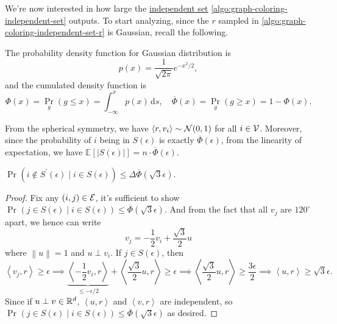 We're now interested in how large the \hyperref[def:independent-set]{independent set} \autoref{algo:graph-coloring-independent-set} outputs. To start analyzing, since the \(r\) sampled in \autoref{algo:graph-coloring-independent-set-r} is Gaussian, recall the following.

\begin{prev}
	The probability density function for Gaussian distribution is
	\[
		p(x) = \frac{1}{\sqrt{2\pi } }e^{- x^{2} / 2},
	\]
	and the cumulated density function is
	\[
		\Phi (x) = \Pr_{g}(g \leq x) = \int_{-\infty}^{x} p(x) \,\mathrm{d}s, \quad \overline{\Phi }(x) = \Pr_{g}(g \geq x) = 1 - \Phi (x).
	\]
\end{prev}

From the spherical symmetry, we have \(\left\langle r, v_i \right\rangle \sim \mathcal{\MakeUppercase{n}} (0, 1)\) for all \(i\in \mathcal{\MakeUppercase{v}} \). Moreover, since the probability of \(i\) being in \(S(\epsilon )\) is exactly \(\overline{\Phi }(\epsilon )\), from the linearity of expectation, we have \(\mathbb{E}_{}\left[\left\vert S(\epsilon ) \right\vert\right] = n\cdot \overline{\Phi }(\epsilon )\).

\begin{lemma}\label{lma:lec18}
	\(\Pr_{}(i \notin S^\prime (\epsilon )\mid i\in S(\epsilon )) \leq \Delta \overline{\Phi }(\sqrt{3}\epsilon)\).
\end{lemma}
\begin{proof}
	Fix any \((i, j)\in \mathcal{\MakeUppercase{e}} \), it's sufficient to show \(\Pr_{}(j\in S(\epsilon )\mid i\in S(\epsilon )) \leq \overline{\Phi}(\sqrt{3}\epsilon)\). And from the fact that all \(v_j\) are \(120^{\circ } \) apart, we hence can write
	\[
		v_j = - \frac{1}{2} v_i + \frac{\sqrt{3}}{2} u
	\]
	where \(\left\lVert u\right\rVert = 1\) and \(u\perp v_i\). If \(j\in S(\epsilon )\), then
	\[
		\left\langle v_j , r \right\rangle \geq \epsilon
		\implies \underbrace{\left\langle -\frac{1}{2}v_i, r \right\rangle}_{\leq - \epsilon / 2} + \left\langle \frac{\sqrt{3}}{2}u, r \right\rangle \geq \epsilon
		\implies \left\langle \frac{\sqrt{3} }{2} u, r \right\rangle \geq \frac{3\epsilon}{2}
		\implies \left\langle u, r \right\rangle \geq \sqrt{3}\epsilon .
	\]
	Since if \(u\perp v\in \mathbb{\MakeUppercase{r}} ^d\), \(\left\langle u, r \right\rangle \) and \(\left\langle v, r \right\rangle \) are independent, so \(\Pr_{}(j\in S(\epsilon )\mid i\in S(\epsilon )) \leq \overline{\Phi }(\sqrt{3} \epsilon )\) as desired.
\end{proof}

